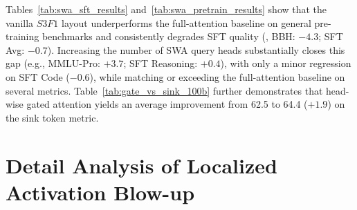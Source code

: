 Tables~\ref{tab:swa_sft_results} and~\ref{tab:swa_pretrain_results} show that the vanilla $S3F1$ layout underperforms the full-attention baseline on general pre-training benchmarks and consistently degrades SFT quality (\eg, BBH: $-4.3$; SFT Avg: $-0.7$). Increasing the number of SWA query heads substantially closes this gap (e.g., MMLU-Pro: $+3.7$; SFT Reasoning: $+0.4$), with only a minor regression on SFT Code ($-0.6$), while matching or exceeding the full-attention baseline on several metrics. Table~\ref{tab:gate_vs_sink_100b} further demonstrates that head-wise gated attention yields an average improvement from 62.5 to 64.4 ($+1.9$) on the sink token metric.


\section{Detail Analysis of Localized Activation Blow-up}\label{app:clip}

